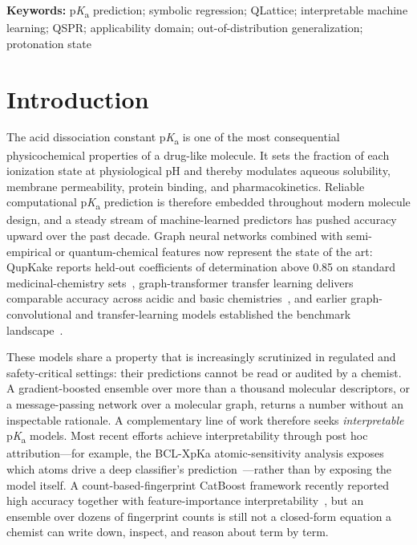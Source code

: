 \documentclass[11pt]{article}
\newcommand{\pka}{p\textit{K}\textsubscript{a}}
\begin{document}
\noindent\textbf{Keywords:} \pka{} prediction; symbolic regression; QLattice;
interpretable machine learning; QSPR; applicability domain; out-of-distribution
generalization; protonation state

\section{Introduction}

The acid dissociation constant \pka{} is one of the most consequential physicochemical
properties of a drug-like molecule. It sets the fraction of each ionization state at
physiological pH and thereby modulates aqueous solubility, membrane permeability,
protein binding, and pharmacokinetics. Reliable computational \pka{} prediction is
therefore embedded throughout modern molecule design, and a steady stream of machine-learned
predictors has pushed accuracy upward over the past decade. Graph neural networks combined
with semi-empirical or quantum-chemical features now represent the state of the art:
QupKake reports held-out coefficients of determination above 0.85 on standard
medicinal-chemistry sets~\cite{abarbanel2024qupkake}, graph-transformer transfer learning
delivers comparable accuracy across acidic and basic chemistries~\cite{qiu2024sat4pka},
and earlier graph-convolutional and transfer-learning models established the
benchmark landscape~\cite{pan2021molgpka,mayr2022gnntransfer}.

These models share a property that is increasingly scrutinized in regulated and
safety-critical settings: their predictions cannot be read or audited by a chemist. A
gradient-boosted ensemble over more than a thousand molecular descriptors, or a
message-passing network over a molecular graph, returns a number without an inspectable
rationale. A complementary line of work therefore seeks \emph{interpretable} \pka{} models.
Most recent efforts achieve interpretability through post hoc attribution---for example,
the BCL-XpKa atomic-sensitivity analysis exposes which atoms drive a deep classifier's
prediction~\cite{decorte2025bclxpka}---rather than by exposing the model itself. A
count-based-fingerprint CatBoost framework recently reported high accuracy together with
feature-importance interpretability~\cite{shen2026catboostpka}, but an ensemble over dozens
of fingerprint counts is still not a closed-form equation a chemist can write down, inspect,
and reason about term by term.
\end{document}
